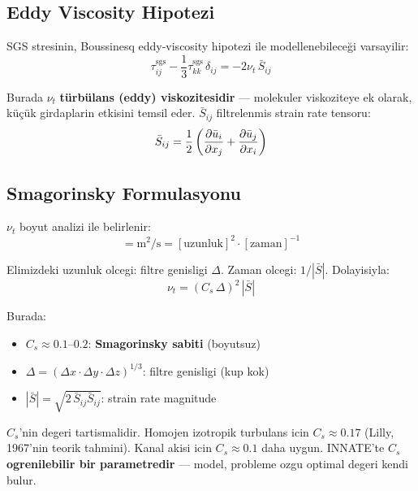 \subsection{Eddy Viscosity Hipotezi}

SGS stresinin, Boussinesq eddy-viscosity hipotezi ile modellenebileceği varsayilir:
\begin{equation}
\tau_{ij}^{\text{sgs}} - \frac{1}{3}\tau_{kk}^{\text{sgs}}\,\delta_{ij} = -2\nu_t\,\bar{S}_{ij}
\label{eq:eddy_viscosity}
\end{equation}

Burada $\nu_t$ \textbf{türbülans (eddy) viskozitesidir} --- molekuler viskoziteye ek olarak, küçük girdaplarin etkisini temsil eder. $\bar{S}_{ij}$ filtrelenmis strain rate tensoru:
\begin{equation}
\bar{S}_{ij} = \frac{1}{2}\left(\frac{\partial \bar{u}_i}{\partial x_j} + \frac{\partial \bar{u}_j}{\partial x_i}\right)
\label{eq:strain_rate}
\end{equation}

\subsection{Smagorinsky Formulasyonu}

$\nu_t$ boyut analizi ile belirlenir:
\begin{equation}
[\nu_t] = \text{m}^2/\text{s} = [\text{uzunluk}]^2 \cdot [\text{zaman}]^{-1}
\end{equation}

Elimizdeki uzunluk olcegi: filtre genisligi $\Delta$. Zaman olcegi: $1/|\bar{S}|$. Dolayisiyla:
\begin{equation}
\boxed{\nu_t = (C_s\,\Delta)^2\,|\bar{S}|}
\label{eq:smagorinsky}
\end{equation}

Burada:
\begin{itemize}
\item $C_s \approx 0.1\text{--}0.2$: \textbf{Smagorinsky sabiti} (boyutsuz)
\item $\Delta = (\Delta x\cdot\Delta y\cdot\Delta z)^{1/3}$: filtre genisligi (kup kok)
\item $|\bar{S}| = \sqrt{2\,\bar{S}_{ij}\bar{S}_{ij}}$: strain rate magnitude
\end{itemize}

\begin{remark}
$C_s$'nin degeri tartismalidir. Homojen izotropik turbulans icin $C_s \approx 0.17$ (Lilly, 1967'nin teorik tahmini). Kanal akisi icin $C_s \approx 0.1$ daha uygun. INNATE'te $C_s$ \textbf{ogrenilebilir bir parametredir} --- model, probleme ozgu optimal degeri kendi bulur.
\end{remark}

